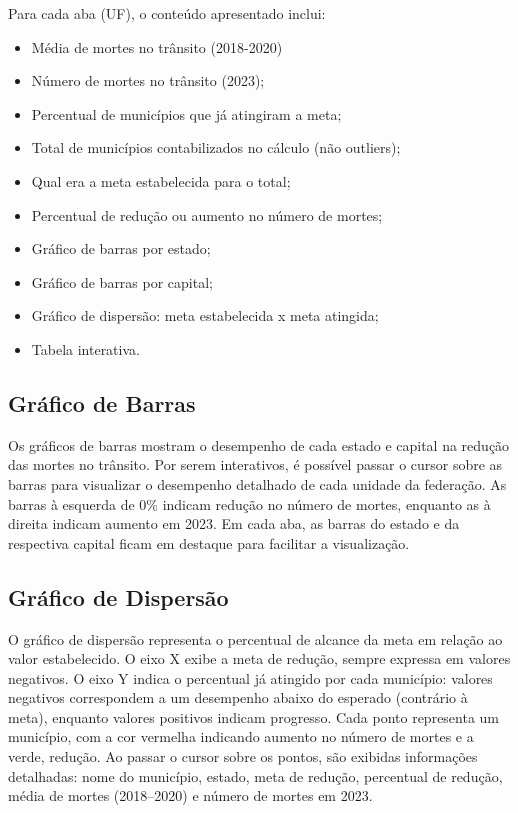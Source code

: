\documentclass[
  letterpaper,
  DIV=11,
  numbers=noendperiod]{scrreprt}
\begin{document}
Para cada aba (UF), o conteúdo apresentado inclui:

\begin{itemize}
\item
  Média de mortes no trânsito (2018-2020)
\item
  Número de mortes no trânsito (2023);
\item
  Percentual de municípios que já atingiram a meta;
\item
  Total de municípios contabilizados no cálculo (não outliers);
\item
  Qual era a meta estabelecida para o total;
\item
  Percentual de redução ou aumento no número de mortes;
\item
  Gráfico de barras por estado;
\item
  Gráfico de barras por capital;
\item
  Gráfico de dispersão: meta estabelecida x meta atingida;
\item
  Tabela interativa.
\end{itemize}

\subsection{Gráfico de Barras}\label{gruxe1fico-de-barras}

Os gráficos de barras mostram o desempenho de cada estado e capital na
redução das mortes no trânsito. Por serem interativos, é possível passar
o cursor sobre as barras para visualizar o desempenho detalhado de cada
unidade da federação. As barras à esquerda de 0\% indicam redução no
número de mortes, enquanto as à direita indicam aumento em 2023. Em cada
aba, as barras do estado e da respectiva capital ficam em destaque para
facilitar a visualização.

\subsection{Gráfico de Dispersão}\label{gruxe1fico-de-dispersuxe3o}

O gráfico de dispersão representa o percentual de alcance da meta em
relação ao valor estabelecido. O eixo X exibe a meta de redução, sempre
expressa em valores negativos. O eixo Y indica o percentual já atingido
por cada município: valores negativos correspondem a um desempenho
abaixo do esperado (contrário à meta), enquanto valores positivos
indicam progresso. Cada ponto representa um município, com a cor
vermelha indicando aumento no número de mortes e a verde, redução. Ao
passar o cursor sobre os pontos, são exibidas informações detalhadas:
nome do município, estado, meta de redução, percentual de redução, média
de mortes (2018--2020) e número de mortes em 2023.
\end{document}
